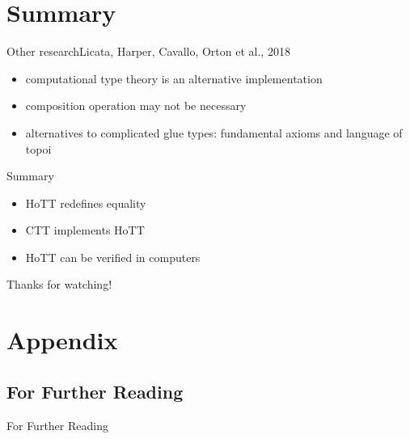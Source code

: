 \documentclass[english, draft]{beamer}
\begin{document}
\section*{Summary}


\begin{frame}{Other research}{Licata, Harper, Cavallo, Orton et al., 2018}
    \begin{itemize}
        \item computational type theory is an alternative implementation 
        \item composition operation may not be necessary
        \item alternatives to complicated glue types: fundamental axioms and language of topoi
    \end{itemize}
\end{frame}


\begin{frame}{Summary}

    \begin{itemize}
        \item HoTT redefines equality
        \item CTT implements HoTT
        \item HoTT can be verified in computers 
    \end{itemize}

Thanks for watching!

\end{frame}

\appendix

\section*{Appendix}

\subsection*{For Further Reading}
\begin{frame}[allowframebreaks]{For Further Reading}



\end{frame}
\end{document}
